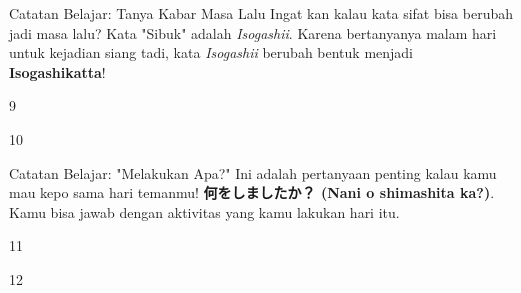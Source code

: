 \begin{lessonbox}{Catatan Belajar: Tanya Kabar Masa Lalu}
    Ingat kan kalau kata sifat bisa berubah jadi masa lalu? Kata "Sibuk" adalah \textit{Isogashii}. Karena bertanyanya malam hari untuk kejadian siang tadi, kata \textit{Isogashii} berubah bentuk menjadi \textbf{Isogashikatta}!
\end{lessonbox}

\begin{convobox}{9}
    \noindent

    \vspace{1.5em}
\end{convobox}

\begin{convobox}{10}
    \noindent
      
      

    \vspace{1.5em}
\end{convobox}

\begin{lessonbox}{Catatan Belajar: "Melakukan Apa?"}
    Ini adalah pertanyaan penting kalau kamu mau kepo sama hari temanmu! \textbf{何をしましたか？ (Nani o shimashita ka?)}. Kamu bisa jawab dengan aktivitas yang kamu lakukan hari itu.
\end{lessonbox}

\begin{convobox}{11}
    \noindent
       
      

    \vspace{1.5em}
\end{convobox}

\begin{convobox}{12}
    \noindent
      
      
      

    \vspace{1.5em}
\end{convobox}

